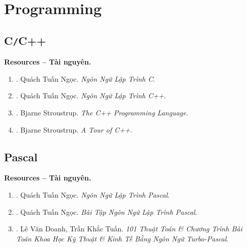 \documentclass{article}
\begin{document}

\section{Programming}

\subsection{C{\tt/}C++}
\textbf{\textsf{Resources -- Tài nguyên.}}
\begin{enumerate}
	\item \cite{Ngoc_C}. {\sc Quách Tuấn Ngọc}. {\it Ngôn Ngữ Lập Trình C}.
	\item \cite{Ngoc_C++}. {\sc Quách Tuấn Ngọc}. {\it Ngôn Ngữ Lập Trình C++}.
	\item \cite{Stroustrup2013}. {\sc Bjarne Stroustrup}. {\it The C++ Programming Language}.
	\item \cite{Stroustrup2018}. {\sc Bjarne Stroustrup}. {\it A Tour of C++}.
\end{enumerate}

\subsection{Pascal}
\textbf{\textsf{Resources -- Tài nguyên.}}
\begin{enumerate}
	\item \cite{Ngoc_Pascal}. {\sc Quách Tuấn Ngọc}. {\it Ngôn Ngữ Lập Trình Pascal}.
	\item \cite{Ngoc_BT_Pascal}. {\sc Quách Tuấn Ngọc}. {\it Bài Tập Ngôn Ngữ Lập Trình Pascal}.
	\item \cite{Doanh_Tuan_Pascal}. {\sc Lê Văn Doanh, Trần Khắc Tuấn}. {\it101 Thuật Toán \& Chương Trình Bài Toán Khoa Học Kỹ Thuật \& Kinh Tế Bằng Ngôn Ngữ Turbo-Pascal}.
\end{enumerate}
\end{document}
